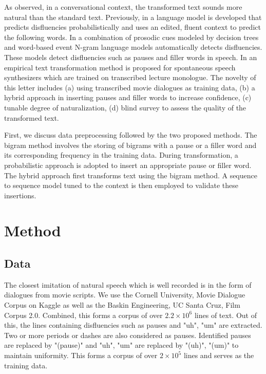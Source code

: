 \documentclass[journal]{IEEEtran}
\begin{document}
As observed, in a conversational context, the transformed text sounds more natural than the standard text. Previously, in \cite{stolcke1} a language model is developed that predicts disfluencies probabilistically and uses an edited, fluent context to predict the following words. In \cite{stolcke2} a combination of prosodic cues modeled by decision trees and word-based event N-gram language models automatically detects disfluencies. These models detect disfluencies such as pauses and filler words in speech. In \cite{sundaram} an empirical text transformation method is proposed for spontaneous speech synthesizers which are trained on transcribed lecture monologue. The novelty of this letter includes (a) using transcribed movie dialogues as training data, (b) a hybrid approach in inserting pauses and filler words to increase confidence, (c) tunable degree of naturalization, (d) blind survey to assess the quality of the transformed text.

First, we discuss data preprocessing followed by the two proposed methods. The bigram method involves the storing of bigrams with a pause or a filler word and its corresponding frequency in the training data. During transformation, a probabilistic approach is adopted to insert an appropriate pause or filler word. The hybrid approach first transforms text using the bigram method. A sequence to sequence model tuned to the context is then employed to validate these insertions.

\section{Method}
\subsection{Data}
The closest imitation of natural speech which is well recorded is in the form of dialogues from movie scripts. We use the Cornell University, Movie Dialogue Corpus on Kaggle\cite{cornell} as well as the Baskin Engineering, UC Santa Cruz, Film Corpus 2.0\cite{ucsc}. Combined, this forms a corpus of over $2.2 \times 10^{6}$ lines of text. Out of this, the lines containing disfluencies such as pauses and "uh", "um" are extracted. Two or more periods or dashes are also considered as pauses. Identified pauses are replaced by "(pause)" and "uh", "um" are replaced by "(uh)", "(um)" to maintain uniformity. This forms a corpus of over $2 \times 10^{5}$ lines and serves as the training data.
\end{document}
